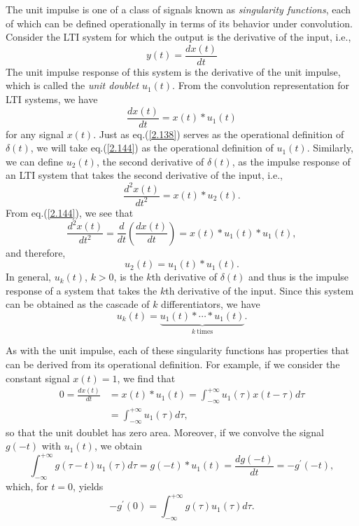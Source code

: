 \documentclass[a4paper,twoside]{book}
\begin{document}
The unit impulse is one of a class of signals known as \textit{singularity functions}, each of which can be defined operationally in terms of its behavior under convolution. Consider the LTI system for which the output is the derivative of the input, i.e.,
\begin{equation}
    y(t)=\dfrac{dx(t)}{dt}
    \label{2.143}
\end{equation}
The unit impulse response of this system is the derivative of the unit impulse, which is called the \textit{unit doublet} $u_1(t)$. From the convolution representation for LTI systems, we have
\begin{equation}
    \frac{dx(t)}{dt}=x(t)*u_1(t)
    \label{2.144}
\end{equation}
for any signal $x(t)$. Just as eq.\;(\ref{2.138}) serves as the operational definition of $\delta(t)$, we will take eq.\;(\ref{2.144}) as the operational definition of $u_1(t)$. Similarly, we can define $u_2(t)$, the second derivative of $\delta(t)$, as the impulse response of an LTI system that takes the second derivative of the input, i.e.,
\begin{equation}
    \frac{d^2x(t)}{dt^2}=x(t)*u_2(t).
    \label{2.145}
\end{equation}
From eq.\;(\ref{2.144}), we see that
\begin{equation}
    \frac{d^2x(t)}{dt^2}=\frac d{dt}\left(\frac{dx(t)}{dt}\right)=x(t)*u_1(t)*u_1(t),
    \label{2.146}
\end{equation}
and therefore,
\begin{equation}
    u_2(t)=u_1(t)*u_1(t).
    \label{2.147}
\end{equation}
In general, $u_k(t)$, $k>0$, is the $k$th derivative of $\delta(t)$ and thus is the impulse response of a system that takes the $k$th derivative of the input. Since this system can be obtained as the cascade of $k$ differentiators, we have
\begin{equation}
    u_k(t)=\underbrace{u_1(t)*\cdots*u_1(t)}_{k\mathrm{~times}}.
    \label{2.148}
\end{equation}

As with the unit impulse, each of these singularity functions has properties that can be derived from its operational definition. For example, if we consider the constant signal $x(t)=1$, we find that $$\begin{aligned}0=\frac{dx(t)}{dt}&= x(t)*u_{1}(t)=\int_{-\infty}^{+\infty}u_{1}(\tau)x(t-\tau) d\tau\\&=\int_{-\infty}^{+\infty}u_{1}(\tau) d\tau,\end{aligned}$$ so that the unit doublet has zero area. Moreover, if we convolve the signal $g(-t)$ with $u_1(t)$, we obtain $$\int_{-\infty}^{+\infty}g(\tau-t)u_1(\tau) d\tau= g(-t)*u_1(t) = \frac{dg(-t)}{dt} = -g^{\prime}(-t),$$ which, for $t=0$, yields
\begin{equation}
    -g^{\prime}(0) = \int_{-\infty}^{+\infty}g(\tau)u_1(\tau) d\tau.
    \label{2.149}
\end{equation}
\end{document}
